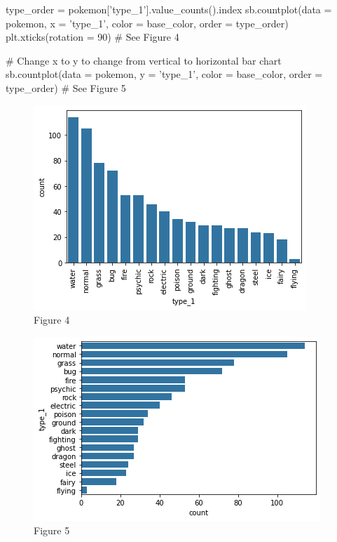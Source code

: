 \begin{python}
	type_order = pokemon['type_1'].value_counts().index
	sb.countplot(data = pokemon, x = 'type_1', color = base_color, order = type_order)
	plt.xticks(rotation = 90) 
	# See Figure 4
	
	# Change x to y to change from vertical to horizontal bar chart
	sb.countplot(data = pokemon, y = 'type_1', color = base_color, order = type_order)
	# See Figure 5
\end{python}

\newpage
\begin{figure}
	\includegraphics{images/figure4.png}
	\caption{Figure 4}\label{fig:figure4}
\end{figure}

\newpage
\begin{figure}
	\includegraphics{images/figure5.png}
	\caption{Figure 5}\label{fig:figure5}
\end{figure}